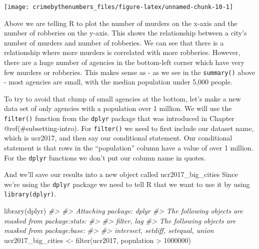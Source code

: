 \documentclass[
]{krantz}
\makeatletter
\newenvironment{Shaded}{\begin{snugshade}}{\end{snugshade}}
\newcommand{\CommentTok}[1]{\textcolor[rgb]{0.37,0.37,0.37}{\textit{#1}}}
\newcommand{\DecValTok}[1]{\textcolor[rgb]{0.06,0.06,0.06}{#1}}
\newcommand{\FunctionTok}[1]{\textcolor[rgb]{0,0,0}{#1}}
\newcommand{\NormalTok}[1]{#1}
\newcommand{\OtherTok}[1]{\textcolor[rgb]{0.37,0.37,0.37}{#1}}
\newcommand{\SpecialCharTok}[1]{\textcolor[rgb]{0,0,0}{#1}}
\newenvironment{kframe}{%
\medskip{}
\setlength{\fboxsep}{.8em}
 \def\at@end@of@kframe{}%
 \ifinner\ifhmode%
  \def\at@end@of@kframe{\end{minipage}}%
  \begin{minipage}{\columnwidth}%
 \fi\fi%
 \def\FrameCommand##1{\hskip\@totalleftmargin \hskip-\fboxsep
 \colorbox{shadecolor}{##1}\hskip-\fboxsep
     \hskip-\linewidth \hskip-\@totalleftmargin \hskip\columnwidth}%
 \MakeFramed {\advance\hsize-\width
   \@totalleftmargin\z@ \linewidth\hsize
   \@setminipage}}%
 {\par\unskip\endMakeFramed%
 \at@end@of@kframe}
\renewenvironment{Shaded}{\begin{kframe}}{\end{kframe}}
\makeatother
\begin{document}
\begin{Shaded}
\end{Shaded}

\begin{center}\texttt{[image: crimebythenumbers\_files/figure-latex/unnamed-chunk-10-1]} \end{center}

Above we are telling R to plot the number of murders on the x-axis and the number of robberies on the y-axis. This shows the relationship between a city's number of murders and number of robberies. We can see that there is a relationship where more murders is correlated with more robberies. However, there are a huge number of agencies in the bottom-left corner which have very few murders or robberies. This makes sense as - as we see in the \texttt{summary()} above - most agencies are small, with the median population under 5,000 people.

To try to avoid that clump of small agencies at the bottom, let's make a new data set of only agencies with a population over 1 million. We will use the \texttt{filter()} function from the \texttt{dplyr} package that was introduced in Chapter @ref(\#subsetting-intro). For \texttt{filter()} we need to first include our dataset name, which is ucr2017, and then say our conditional statement. Our conditional statement is that rows in the ``population'' column have a value of over 1 million. For the \texttt{dplyr} functions we don't put our column name in quotes.

And we'll save our results into a new object called ucr2017\_big\_cities Since we're using the \texttt{dplyr} package we need to tell R that we want to use it by using \texttt{library(dplyr)}.

\begin{Shaded}
\begin{Highlighting}[]
\FunctionTok{library}\NormalTok{(dplyr)}
\CommentTok{\#\textgreater{} }
\CommentTok{\#\textgreater{} Attaching package: \textquotesingle{}dplyr\textquotesingle{}}
\CommentTok{\#\textgreater{} The following objects are masked from \textquotesingle{}package:stats\textquotesingle{}:}
\CommentTok{\#\textgreater{} }
\CommentTok{\#\textgreater{}     filter, lag}
\CommentTok{\#\textgreater{} The following objects are masked from \textquotesingle{}package:base\textquotesingle{}:}
\CommentTok{\#\textgreater{} }
\CommentTok{\#\textgreater{}     intersect, setdiff, setequal, union}
\NormalTok{ucr2017\_big\_cities }\OtherTok{\textless{}{-}} \FunctionTok{filter}\NormalTok{(ucr2017, population }\SpecialCharTok{\textgreater{}} \DecValTok{1000000}\NormalTok{) }
\end{Highlighting}
\end{Shaded}
\end{document}
